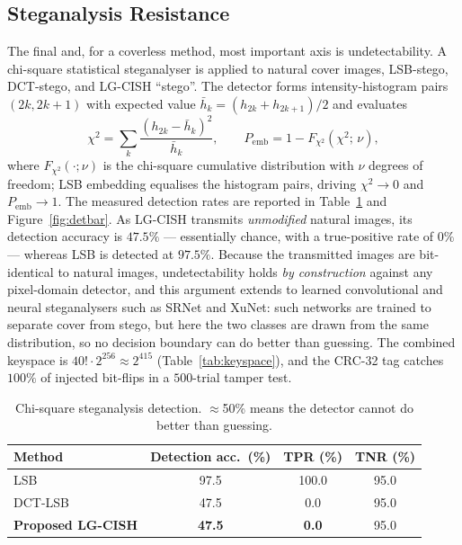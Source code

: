 \documentclass[11pt]{article}
\begin{document}
\subsection{Steganalysis Resistance}\label{sec:steganalysis}
The final and, for a coverless method, most important axis is undetectability. A
chi-square statistical steganalyser is applied to natural cover images, LSB-stego,
DCT-stego, and LG-CISH ``stego''. The detector forms intensity-histogram pairs
$(2k,2k{+}1)$ with expected value $\bar h_k=(h_{2k}+h_{2k+1})/2$ and evaluates
\begin{equation}
  \chi^2=\sum_{k}\frac{\left(h_{2k}-\bar h_k\right)^2}{\bar h_k},
  \qquad
  P_{\mathrm{emb}}=1-F_{\chi^2}\!\left(\chi^2;\,\nu\right),
  \label{eq:chi2}
\end{equation}
where $F_{\chi^2}(\cdot;\nu)$ is the chi-square cumulative distribution with $\nu$
degrees of freedom; LSB embedding equalises the histogram pairs, driving
$\chi^2\!\to\!0$ and $P_{\mathrm{emb}}\!\to\!1$. The measured detection rates are
reported in Table~\ref{tab:steg} and Figure~\ref{fig:detbar}. As LG-CISH transmits
\emph{unmodified} natural images, its detection accuracy is $47.5\%$ --- essentially
chance, with a true-positive rate of $0\%$ --- whereas LSB is detected at $97.5\%$.
Because the transmitted images are bit-identical to natural images, undetectability
holds \emph{by construction} against any pixel-domain detector, and this argument
extends to learned convolutional and neural steganalysers such as SRNet and XuNet:
such networks are trained to separate cover from stego, but here the two classes are
drawn from the same distribution, so no decision boundary can do better than
guessing. The combined keyspace is $40!\cdot2^{256}\approx2^{415}$
(Table~\ref{tab:keyspace}), and the CRC-32 tag catches $100\%$ of injected bit-flips
in a $500$-trial tamper test.

\begin{table}[H]
\centering
\caption{Chi-square steganalysis detection. $\approx$50\% means the detector cannot do better than guessing.}\label{tab:steg}
\begin{tabular}{@{}lccc@{}}
\toprule
Method & Detection acc.\ (\%) & TPR (\%) & TNR (\%) \\
\midrule
LSB              & 97.5 & 100.0 & 95.0 \\
DCT-LSB          & 47.5 & 0.0 & 95.0 \\
\textbf{Proposed LG-CISH} & \textbf{47.5} & \textbf{0.0} & 95.0 \\
\bottomrule
\end{tabular}
\end{table}
\end{document}
